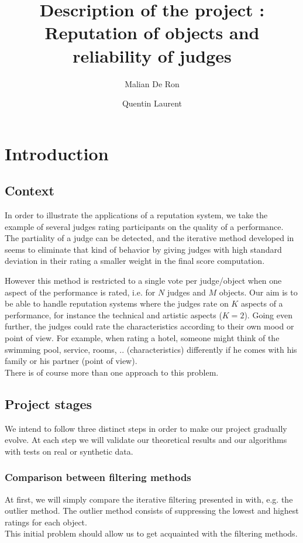 \documentclass[12pt,a4paper]{article}
\title{Description of the project : Reputation of objects and reliability of judges}
\author{Malian De Ron \and Quentin Laurent}
\begin{document}
	
\maketitle

\tableofcontents
\section{Introduction}
\subsection*{Context}
In order to illustrate the applications of a reputation system, we take the example of several judges rating participants on the quality of a performance. The partiality of a judge can be detected, and the iterative method developed in \cite{Cristo1} seems to eliminate that kind of behavior by giving judges with high standard deviation in their rating a smaller weight in the final score computation.

However this method is restricted to a single vote per judge/object when one aspect of the performance is rated, i.e. for $N$ judges and $M$ objects. Our aim is to be able to handle reputation systems where the judges rate on $K$ aspects of a performance, for instance the technical and artistic aspects ($K=2$). 
Going even further, the judges could rate the characteristics according to their own mood or point of view. For example, when rating a hotel, someone might think of the swimming pool, service, rooms, .. (characteristics) differently if he comes with his family or his partner (point of view).\\
There is of course more than one approach to this problem. 

\subsection*{Project stages}
We intend to follow three distinct steps in order to make our project gradually evolve. At each step we will validate our theoretical results and our algorithms with tests on real or synthetic data.

\subsubsection*{Comparison between filtering methods}
At first, we will simply compare the iterative filtering presented in \cite{Cristo1} 
 with, e.g. the outlier method. The outlier method consists of suppressing the lowest and highest ratings for each object.\\
 This initial problem should allow us to get acquainted with the filtering methods.
\end{document}
